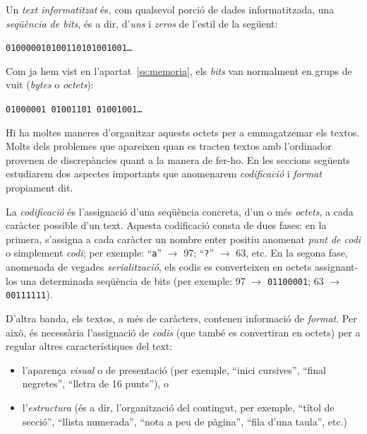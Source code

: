 
Un \emph{text informatitzat} és, com qualsevol porció de dades
informatitzada, una \emph{seqüència de bits}, és a dir, d'\emph{uns} i
\emph{zeros} de l'estil de la següent:

\begin{center}
 \texttt{010000010100110101001001\ldots}
\end{center}

Com ja hem vist en l'apartat~\ref{ss:memoria}, els \emph{bits} van
normalment en grups de vuit (\emph{bytes} o \emph{octets}):
\begin{center}
 \texttt{01000001 01001101 01001001\ldots}
\end{center}

Hi ha moltes maneres d'organitzar aquests octets per a emmagatzemar
els textos.  Molts dels problemes que apareixen quan es tracten textos
amb l'ordinador provenen de discrepàncies quant a la manera de fer-ho.
En les seccions següents estudiarem dos aspectes importants que
anomenarem \emph{codificació} i \emph{format} propiament dit.

La \emph{codificació} és l'assignació d'una seqüència concreta, d'un o més
\emph{octets}, a cada caràcter possible d'un text. Aquesta codificació consta de dues fases: en la
primera, s'assigna a cada caràcter un nombre enter positiu anomenat
\emph{punt de codi} o simplement \emph{codi}; per exemple:
``\texttt{a}'' $\to$ 97; ``\texttt{?}'' $\to$ 63, etc. En la segona
fase, anomenada de vegades \emph{serialització}, els codis es
converteixen en octets assignant-los una determinada seqüència de bits
(per exemple: 97 $\to$ \texttt{01100001}; 63 $\to$ \texttt{00111111}).


D'altra banda, els textos, a més de caràcters, contenen informació de
\emph{format}. Per això, és necessària l'assignació de \emph{codis} (que
també es convertiran en octets) per a regular altres característiques
del text:
\begin{itemize}
  \item l'aparença \emph{visual} o de
    presentació (per exemple, ``inici cursives'', ``final negretes'',
    ``lletra de 16 punts''), o
  \item l'\emph{estructura} (és a dir, l'organització del contingut,
    per exemple, ``títol de secció'', ``llista numerada'', ``nota a
    peu de pàgina'', ``fila d'una taula'', etc.)
\end{itemize}

